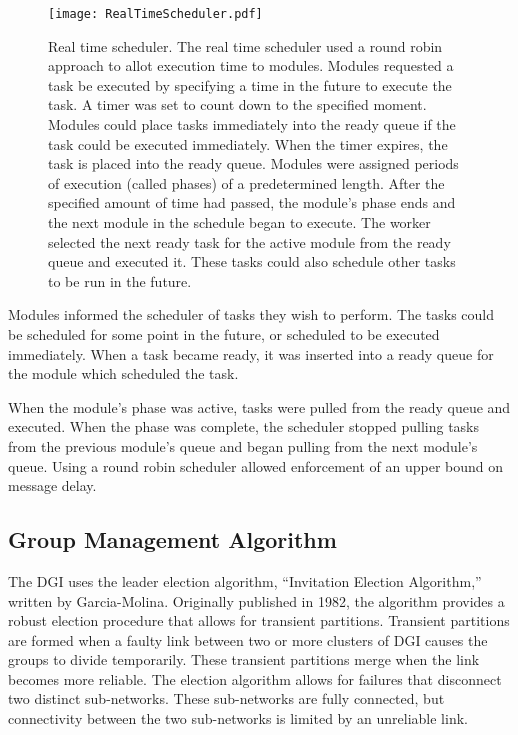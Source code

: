 \begin{figure}[!h]
\centering
\texttt{[image: RealTimeScheduler.pdf]}
\captionsetup{singlelinecheck=off}
\caption[Real time scheduler.]{Real time scheduler. The real time scheduler used a round robin approach to allot execution time to modules.
\raisebox{.5pt}{\textcircled{\raisebox{-.9pt} {1}}} Modules requested a task be executed by specifying a time in the future to execute the task.
\raisebox{.5pt}{\textcircled{\raisebox{-.9pt} {2}}} A timer was set to count down to the specified moment. 
Modules could place tasks immediately into the ready queue if the task could be executed immediately.
\raisebox{.5pt}{\textcircled{\raisebox{-.9pt} {3}}} When the timer expires, the task is placed into the ready queue.
\raisebox{.5pt}{\textcircled{\raisebox{-.9pt} {4}}} Modules were assigned periods of execution (called phases) of a predetermined length.
After the specified amount of time had passed, the module's phase ends and the next module in the schedule began to execute.
\raisebox{.5pt}{\textcircled{\raisebox{-.9pt} {5}}} The worker selected the next ready task for the active module from the ready queue and executed it.
These tasks could also schedule other tasks to be run in the future.
}
\label{fig:REALTIMESCHEDULER}
\end{figure}

Modules informed the scheduler of tasks they wish to perform.
The tasks could be scheduled for some point in the future, or scheduled to be executed immediately.
When a task became ready, it was inserted into a ready queue for the module which scheduled the task.

When the module's phase was active, tasks were pulled from the ready queue and executed.
When the phase was complete, the scheduler stopped pulling tasks from the previous module's queue and began pulling from the next module's queue.
Using a round robin scheduler allowed enforcement of an upper bound on message delay.

\subsection{Group Management Algorithm}

The DGI uses the leader election algorithm, ``Invitation Election Algorithm,'' written by Garcia-Molina\cite{INVITATIONELECTION}.
Originally published in 1982, the algorithm provides a robust election procedure that allows for transient partitions.
Transient partitions are formed when a faulty link between two or more clusters of \ac{DGI} causes the groups to divide temporarily.
These transient partitions merge when the link becomes more reliable.
The election algorithm allows for failures that disconnect two distinct sub-networks.
These sub-networks are fully connected, but connectivity between the two sub-networks is limited by an unreliable link.

